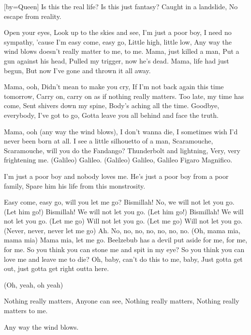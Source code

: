 [by={Queen}]
\beginverse\singlespacing
Is this the real life?
Is this just fantasy?
Caught in a landslide,
No escape from reality.

Open your eyes,
Look up to the skies and see,
I'm just a poor boy, I need no sympathy,
'cause I'm easy come, easy go,
Little high, little low,
Any way the wind blows doesn't really matter to me, to me.
\endverse
\beginverse\singlespacing
Mama, just killed a man,
Put a gun against his head,
Pulled my trigger, now he's dead.
Mama, life had just begun,
But now I've gone and thrown it all away.

Mama, ooh,
Didn't mean to make you cry,
If I'm not back again this time tomorrow,
Carry on, carry on as if nothing really matters.
\endverse
\beginverse\singlespacing
Too late, my time has come,
Sent shivers down my spine,
Body's aching all the time.
Goodbye, everybody, I've got to go,
Gotta leave you all behind and face the truth.

Mama, ooh (any way the wind blows),
I don't wanna die,
I sometimes wish I'd never been born at all.
\endverse
\beginverse\singlespacing
I see a little silhouetto of a man,
Scaramouche, Scaramouche, will you do the Fandango?
Thunderbolt and lightning,
Very, very frightening me.
(Galileo) Galileo.
(Galileo) Galileo,
Galileo Figaro
Magnifico.

I'm just a poor boy and nobody loves me.
He's just a poor boy from a poor family,
Spare him his life from this monstrosity.

Easy come, easy go, will you let me go?
Bismillah! No, we will not let you go.
(Let him go!) Bismillah! We will not let you go.
(Let him go!) Bismillah! We will not let you go.
(Let me go) Will not let you go.
(Let me go) Will not let you go.
(Never, never, never let me go) Ah.
No, no, no, no, no, no, no.
(Oh, mama mia, mama mia) Mama mia, let me go.
Beelzebub has a devil put aside for me, for me, for me.
\endverse
\beginverse\singlespacing
So you think you can stone me and spit in my eye?
So you think you can love me and leave me to die?
Oh, baby, can't do this to me, baby,
Just gotta get out, just gotta get right outta here.

(Oh, yeah, oh yeah)

Nothing really matters,
Anyone can see,
Nothing really matters,
Nothing really matters to me.

Any way the wind blows.
\endverse
\endsong
